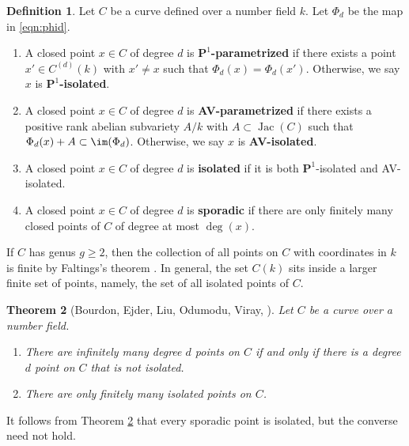 \documentclass[11pt,reqno]{amsart}
\theoremstyle{plain}
\newtheorem{theorem}{Theorem}%
\theoremstyle{definition}
\newtheorem{definition}[theorem]{Definition}
\newcommand{\PP}{\mathbf P}
\newcommand{\Jac}{\operatorname{Jac}}
\newcommand{\sachi}[1]{\textcolor{purple}{Sachi: #1}}
\begin{document}


\begin{definition} Let $C$ be a curve defined over a number field $k$. Let $\Phi_d$ be the map in \eqref{eqn:phid}.
\begin{enumerate}
\item A closed point $x \in C$ of degree $d$ is $\PP^1$\textbf{-parametrized} if there exists a point $x' \in C^{(d)}(k)$ with $x' \neq x$ such that $\Phi_d(x)=\Phi_d(x')$. Otherwise, we say $x$ is $\PP^1$\textbf{-isolated}.
\item A closed point $x \in C$ of degree $d$ is \textbf{AV-parametrized} if there exists a positive rank abelian subvariety $A/k$ with  $A \subset \Jac(C)$ such that $\Phi_d(x)+A \subset \im(\Phi_d)$. Otherwise, we say $x$ is \textbf{AV-isolated}.
\item A closed point $x \in C$ of degree $d$ is \textbf{isolated} if it is both $\PP^1$-isolated and AV-isolated.
\item A closed point $x \in C$ of degree $d$ is \textbf{sporadic} if there are only finitely many closed points of $C$ of degree at most $\deg(x)$.
\end{enumerate}
\end{definition}

If $C$ has genus $g\geq 2$, then the collection of all points on $C$ with coordinates in $k$ is finite by Faltings's theorem \cite{faltings83}. In general, the set $C(k)$ sits inside a larger finite set of points, namely, the set of all isolated points of $C$.
    \begin{theorem}[{Bourdon, Ejder, Liu, Odumodu, Viray, \cite[Theorem 4.2]{BELOV}}]\label{thm:FiniteIsolated}
        Let $C$ be a curve over a number field.
        \begin{enumerate}
            \item There are infinitely many degree $d$ points on $C$ if and only if there is a degree $d$ point on $C$ that is \emph{not} isolated.
            \item There are only finitely many isolated points on $C$.
        \end{enumerate}
    \end{theorem}
It follows from Theorem \ref{thm:FiniteIsolated} that every sporadic point is isolated, but the converse need not hold.
\end{document}

